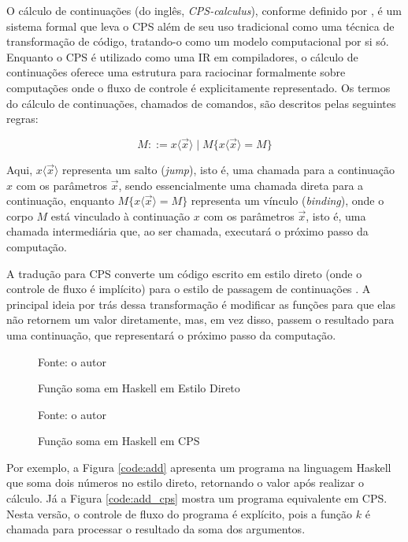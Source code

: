 O cálculo de continuações (do inglês, \textit{CPS-calculus}), conforme definido por , é um sistema formal que leva o CPS além de seu uso tradicional como uma técnica de transformação de código, tratando-o como um modelo computacional por si só.
Enquanto o CPS é utilizado como uma IR em compiladores, o cálculo de continuações oferece uma estrutura para raciocinar formalmente sobre computações onde o fluxo de controle é explicitamente representado.
Os termos do cálculo de continuações, chamados de comandos, são descritos pelas seguintes regras:

\begin{equation}
  M ::= x\langle \vec{x} \rangle \mid M\{x\langle \vec{x} \rangle = M\}
\end{equation}

Aqui, $x\langle \vec{x} \rangle$ representa um salto (\textit{jump}), isto é, uma chamada para a continuação $x$ com os parâmetros $\vec{x}$, sendo essencialmente uma chamada direta para a continuação, enquanto $M\{x\langle \vec{x} \rangle = M\}$ representa um vínculo (\textit{binding}), onde o corpo $M$ está vinculado à continuação $x$ com os parâmetros $\vec{x}$, isto é, uma chamada intermediária que, ao ser chamada, executará o próximo passo da computação.

A tradução para CPS converte um código escrito em estilo direto (onde o controle de fluxo é implícito) para o estilo de passagem de continuações \cite{FLANAGAN1993}.
A principal ideia por trás dessa transformação é modificar as funções para que elas não retornem um valor diretamente, mas, em vez disso, passem o resultado para uma continuação, que representará o próximo passo da computação.

\begin{figure}
  \caption{Função soma em Haskell em Estilo Direto}
  \small{Fonte: o autor}
  
\end{figure}

\begin{figure}
  \caption{Função soma em Haskell em CPS}
  \small{Fonte: o autor}
  
\end{figure}

Por exemplo, a Figura \ref{code:add} apresenta um programa na linguagem Haskell que soma dois números no estilo direto, retornando o valor após realizar o cálculo.
Já a Figura \ref{code:add_cps} mostra um programa equivalente em CPS.
Nesta versão, o controle de fluxo do programa é explícito, pois a função $k$ é chamada para processar o resultado da soma dos argumentos.

